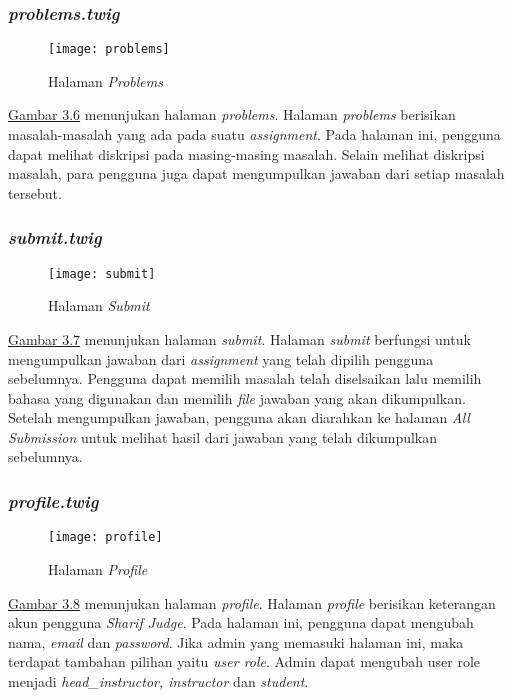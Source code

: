 \subsubsection{\textit{problems.twig}}
\begin{figure}[H]
	\centering  
	\texttt{[image: problems]}  
	\caption[Halaman \textit{Problems}]{Halaman \textit{Problems}} 
	\label{fig:problems} 
\end{figure} 
\hyperref[fig:problems]{Gambar 3.6} menunjukan halaman \textit{problems}. Halaman \textit{problems} berisikan masalah-masalah yang ada pada suatu \textit{assignment}. Pada halaman ini, pengguna dapat melihat diskripsi pada masing-masing masalah. Selain melihat diskripsi masalah, para pengguna juga dapat mengumpulkan jawaban dari setiap masalah tersebut.

\subsubsection{\textit{submit.twig}}
\begin{figure}[H]
	\centering  
	\texttt{[image: submit]}  
	\caption[Halaman \textit{Submit}]{Halaman \textit{Submit}} 
	\label{fig:submit} 
\end{figure} 
\hyperref[fig:submit]{Gambar 3.7} menunjukan halaman \textit{submit}. Halaman \textit{submit} berfungsi untuk mengumpulkan jawaban dari \textit{assignment} yang telah dipilih pengguna sebelumnya. Pengguna dapat memilih masalah telah diselsaikan lalu memilih bahasa yang digunakan dan memilih \textit{file} jawaban yang akan dikumpulkan. Setelah mengumpulkan jawaban, pengguna akan diarahkan ke halaman \textit{All Submission} untuk melihat hasil dari jawaban yang telah dikumpulkan sebelumnya.

\subsubsection{\textit{profile.twig}}
\begin{figure}[H]
	\centering  
	\texttt{[image: profile]}  
	\caption[Halaman \textit{Profile}]{Halaman \textit{Profile}} 
	\label{fig:profile} 
\end{figure} 
\hyperref[fig:profile]{Gambar 3.8} menunjukan halaman \textit{profile}. Halaman \textit{profile} berisikan keterangan akun pengguna \textit{Sharif Judge}. Pada halaman ini, pengguna dapat mengubah nama, \textit{email} dan \textit{password}. Jika admin yang memasuki halaman ini, maka terdapat tambahan pilihan yaitu \textit{user role}. Admin dapat mengubah user role menjadi \textit{head\_instructor, instructor} dan \textit{student}.

